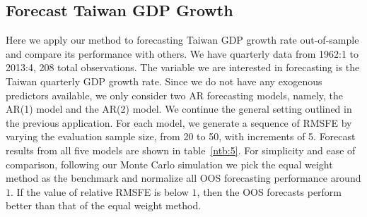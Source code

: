 \subsection{Forecast Taiwan GDP Growth}
Here we apply our method to forecasting Taiwan GDP growth rate out-of-sample and compare its performance with others. We have quarterly data from 1962:1 to 2013:4, 208 total observations. The variable we are interested in forecasting is the Taiwan quarterly GDP growth rate. Since we do not have any exogenous predictors available, we only consider two AR forecasting models, namely, the AR(1) model and the AR(2) model. We continue the general setting outlined in the previous application. For each model, we generate a sequence of RMSFE by varying the evaluation sample size, from 20 to 50, with increments of 5. Forecast results from all five models are shown in table~\ref{ntb:5}. For simplicity and ease of comparison, following our Monte Carlo simulation we pick the equal weight method as the benchmark and normalize all OOS forecasting performance around $1$. If the value of relative RMSFE is below $1$, then the OOS forecasts perform better than that of the equal weight method.


